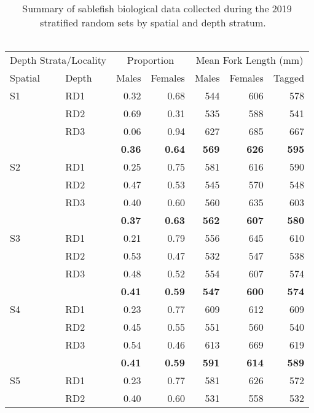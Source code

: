 \documentclass[12pt]{article}\usepackage[]{graphicx}\usepackage[]{color}
\begin{document}
\begin{table}[!h]

\caption{\label{tab:table8}Summary of sablefish biological data collected during the 2019 stratified random sets by spatial and depth stratum. ~\\
\hspace*{0.333em}\\}
\fontsize{8}{10}\selectfont
\begin{tabular}[t]{llrrrrr}
\toprule
\multicolumn{2}{c}{Depth Strata/Locality} & \multicolumn{2}{c}{Proportion} & \multicolumn{3}{c}{Mean Fork Length (mm)} \\
\cmidrule(l{3pt}r{3pt}){1-2} \cmidrule(l{3pt}r{3pt}){3-4} \cmidrule(l{3pt}r{3pt}){5-7}
Spatial & Depth & Males & Females & Males & Females & Tagged\\
\midrule
S1 & RD1 & 0.32 & 0.68 & 544 & 606 & 578\\
 & RD2 & 0.69 & 0.31 & 535 & 588 & 541\\
 & RD3 & 0.06 & 0.94 & 627 & 685 & 667\\
\hline
\textbf{} & \textbf{} & \textbf{0.36} & \textbf{0.64} & \textbf{569} & \textbf{626} & \textbf{595}\\
\hline
S2 & RD1 & 0.25 & 0.75 & 581 & 616 & 590\\
 & RD2 & 0.47 & 0.53 & 545 & 570 & 548\\
 & RD3 & 0.40 & 0.60 & 560 & 635 & 603\\
\hline
\textbf{} & \textbf{} & \textbf{0.37} & \textbf{0.63} & \textbf{562} & \textbf{607} & \textbf{580}\\
\hline
S3 & RD1 & 0.21 & 0.79 & 556 & 645 & 610\\
 & RD2 & 0.53 & 0.47 & 532 & 547 & 538\\
 & RD3 & 0.48 & 0.52 & 554 & 607 & 574\\
\hline
\textbf{} & \textbf{} & \textbf{0.41} & \textbf{0.59} & \textbf{547} & \textbf{600} & \textbf{574}\\
\hline
S4 & RD1 & 0.23 & 0.77 & 609 & 612 & 609\\
 & RD2 & 0.45 & 0.55 & 551 & 560 & 540\\
 & RD3 & 0.54 & 0.46 & 613 & 669 & 619\\
\hline
\textbf{} & \textbf{} & \textbf{0.41} & \textbf{0.59} & \textbf{591} & \textbf{614} & \textbf{589}\\
\hline
S5 & RD1 & 0.23 & 0.77 & 581 & 626 & 572\\
 & RD2 & 0.40 & 0.60 & 531 & 558 & 532\\

\end{tabular}
\end{table}
\end{document}
